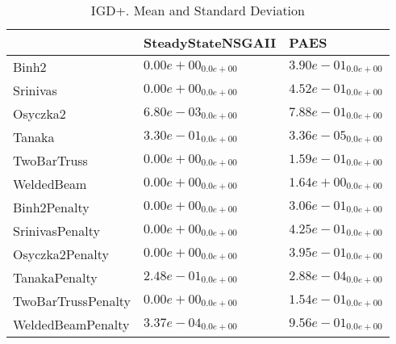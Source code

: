 \documentclass{article}
\begin{document}
\begin{table}
\caption{IGD+. Mean and Standard Deviation}
\label{table: IGD+}
\centering
\begin{scriptsize}
\begin{tabular}{lll}
\hline & SteadyStateNSGAII &  PAES\\
\hline 
Binh2 & \cellcolor{gray95}$  0.00e+00_{ 0.0e+00}$ & \cellcolor{gray25}$  3.90e-01_{ 0.0e+00}$ \\
Srinivas & \cellcolor{gray95}$  0.00e+00_{ 0.0e+00}$ & \cellcolor{gray25}$  4.52e-01_{ 0.0e+00}$ \\
Osyczka2 & \cellcolor{gray95}$  6.80e-03_{ 0.0e+00}$ & \cellcolor{gray25}$  7.88e-01_{ 0.0e+00}$ \\
Tanaka & \cellcolor{gray25}$  3.30e-01_{ 0.0e+00}$ & \cellcolor{gray95}$  3.36e-05_{ 0.0e+00}$ \\
TwoBarTruss & \cellcolor{gray95}$  0.00e+00_{ 0.0e+00}$ & \cellcolor{gray25}$  1.59e-01_{ 0.0e+00}$ \\
WeldedBeam & \cellcolor{gray95}$  0.00e+00_{ 0.0e+00}$ & \cellcolor{gray25}$  1.64e+00_{ 0.0e+00}$ \\
Binh2Penalty & \cellcolor{gray95}$  0.00e+00_{ 0.0e+00}$ & \cellcolor{gray25}$  3.06e-01_{ 0.0e+00}$ \\
SrinivasPenalty & \cellcolor{gray95}$  0.00e+00_{ 0.0e+00}$ & \cellcolor{gray25}$  4.25e-01_{ 0.0e+00}$ \\
Osyczka2Penalty & \cellcolor{gray95}$  0.00e+00_{ 0.0e+00}$ & \cellcolor{gray25}$  3.95e-01_{ 0.0e+00}$ \\
TanakaPenalty & \cellcolor{gray25}$  2.48e-01_{ 0.0e+00}$ & \cellcolor{gray95}$  2.88e-04_{ 0.0e+00}$ \\
TwoBarTrussPenalty & \cellcolor{gray95}$  0.00e+00_{ 0.0e+00}$ & \cellcolor{gray25}$  1.54e-01_{ 0.0e+00}$ \\
WeldedBeamPenalty & \cellcolor{gray95}$  3.37e-04_{ 0.0e+00}$ & \cellcolor{gray25}$  9.56e-01_{ 0.0e+00}$ \\
\hline
\end{tabular}
\end{scriptsize}
\end{table}
\end{document}
